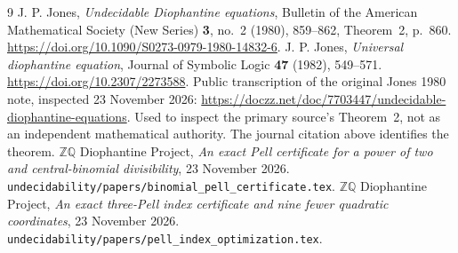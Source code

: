 \documentclass[11pt]{article}
\begin{document}
\begin{thebibliography}{9}
 J. P. Jones,
\emph{Undecidable Diophantine equations},
Bulletin of the American Mathematical Society (New Series)
\textbf{3}, no.~2 (1980), 859--862, Theorem~2, p.~860.
\url{https://doi.org/10.1090/S0273-0979-1980-14832-6}.
 J. P. Jones,
\emph{Universal diophantine equation}, Journal of Symbolic Logic
\textbf{47} (1982), 549--571.
\url{https://doi.org/10.2307/2273588}.
 Public transcription of the original Jones
1980 note, inspected 23 November 2026:
\url{https://doczz.net/doc/7703447/undecidable-diophantine-equations}.
Used to inspect the primary source's Theorem~2, not as an independent
mathematical authority. The journal citation above identifies the theorem.
 \(\mathbb Z\mathbb Q\) Diophantine Project,
\emph{An exact Pell certificate for a power of two and central-binomial
divisibility}, 23 November 2026.
\nolinkurl{undecidability/papers/binomial_pell_certificate.tex}.
 \(\mathbb Z\mathbb Q\) Diophantine Project,
\emph{An exact three-Pell index certificate and nine fewer quadratic
coordinates}, 23 November 2026.
\nolinkurl{undecidability/papers/pell_index_optimization.tex}.
\end{thebibliography}
\end{document}
